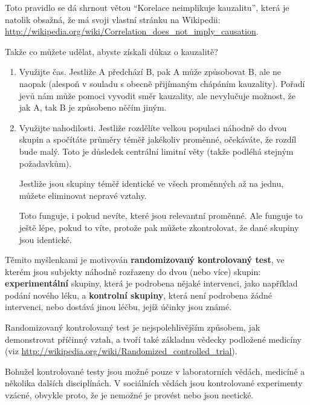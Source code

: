 \documentclass[12pt]{book}
\begin{document}
Toto pravidlo se dá shrnout větou ``Korelace neimplikuje kauzalitu'', která je natolik obsažná, že má svoji vlastní stránku na Wikipedii: \url{http://wikipedia.org/wiki/Correlation_does_not_imply_causation}.

Takže co můžete udělat, abyste získali důkaz o kauzalitě?

\begin{enumerate}

\item Využijte čas.  Jestliže A předchází B, pak A může způsobovat B, ale ne naopak (alespoň v souladu s obecně přijímaným chápáním kauzality). Pořadí jevů nám může pomoci vyvodit směr kauzality, ale nevylučuje možnost, že jak A, tak B je způsobeno něčím jiným.

\item Využijte nahodilosti.  Jestliže rozdělíte velkou populaci náhodně do dvou skupin a spočítáte průměry téměř jakékoliv proměnné, očekáváte, že rozdíl bude malý. Toto je důsledek centrální limitní věty (takže podléhá stejným požadavkům).

Jestliže jsou skupiny téměř identické ve všech proměnných až na jednu, můžete eliminovat nepravé vztahy.

  Toto funguje, i pokud nevíte, které jsou relevantní proměnné. Ale funguje to ještě lépe, pokud to víte, protože pak můžete zkontrolovat, že dané skupiny jsou identické.


\end{enumerate}

Těmito myšlenkami je motivován {\bf randomizovaný kontrolovaný test}, ve kterém jsou subjekty náhodně rozřazeny do dvou (nebo více) skupin: {\bf experimentální} skupiny, která je podrobena nějaké intervenci, jako například podání nového léku, a {\bf kontrolní skupiny}, která není podrobena žádné intervenci, nebo dostává jinou léčbu, jejíž účinky jsou známé.

Randomizovaný kontrolovaný test je nejspolehlivějším způsobem, jak demonstrovat příčinný vztah, a tvoří také základnu vědecky podložené medicíny (viz \url{http://wikipedia.org/wiki/Randomized_controlled_trial}).

Bohužel kontrolované testy jsou možné pouze v laboratorních vědách, medicíně a několika dalších disciplínách. V sociálních vědách jsou kontrolované experimenty vzácné, obvykle proto, že je nemožné je provést nebo jsou neetické.
\end{document}
